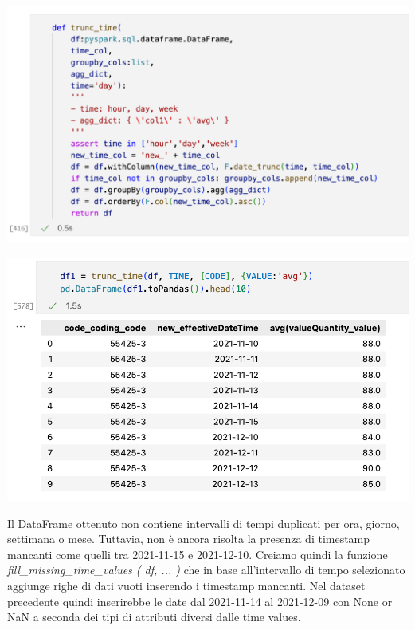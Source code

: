 \documentclass[11pt, oneside]{article}
\begin{document}
\begin{center}
\includegraphics[scale=0.45]{3_trunc.png}
\end{center}

\begin{center}
\includegraphics[scale=0.45]{3_trunc_df.png}
\end{center}

Il DataFrame ottenuto non contiene intervalli di tempi duplicati per ora, giorno, settimana o mese. Tuttavia, non è ancora risolta la presenza di timestamp mancanti come quelli tra 2021-11-15 e 2021-12-10. Creiamo quindi la funzione \emph{fill\_missing\_time\_values ( df, ... )} che in base all'intervallo di tempo selezionato aggiunge righe di dati vuoti inserendo i timestamp mancanti. Nel dataset precedente quindi inserirebbe le date dal 2021-11-14 al 2021-12-09 con None or NaN a seconda dei tipi di attributi diversi dalle time values.
\end{document}
